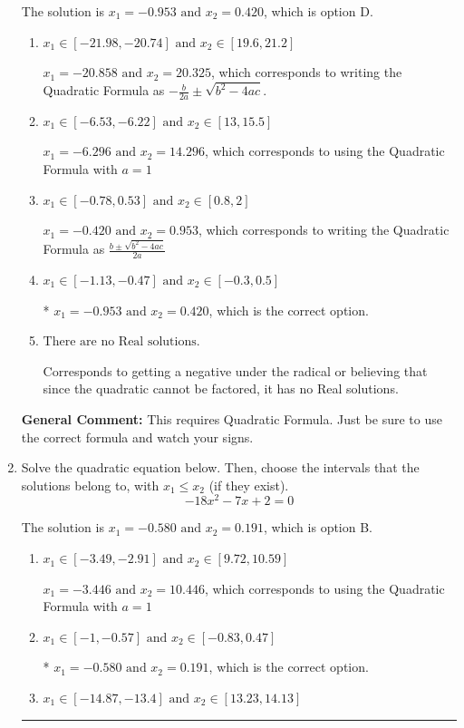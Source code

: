 \documentclass{extbook}[14pt]
\newcommand{\litem}[1]{\item #1

\rule{\textwidth}{0.4pt}}
\begin{document}
\begin{enumerate}
{The solution is \( x_1 = -0.953 \text{ and } x_2 = 0.420 \), which is option D.\begin{enumerate}[label=\Alph*.]
\item \( x_1 \in [-21.98, -20.74] \text{ and } x_2 \in [19.6, 21.2] \)

 $x_1 = -20.858 \text{ and } x_2 = 20.325$, which corresponds to writing the Quadratic Formula as $-\frac{b}{2a} \pm \sqrt{b^2 - 4ac}$.
\item \( x_1 \in [-6.53, -6.22] \text{ and } x_2 \in [13, 15.5] \)

 $x_1 = -6.296 \text{ and } x_2 = 14.296$, which corresponds to using the Quadratic Formula with $a=1$
\item \( x_1 \in [-0.78, 0.53] \text{ and } x_2 \in [0.8, 2] \)

 $x_1 = -0.420 \text{ and } x_2 = 0.953$, which corresponds to writing the Quadratic Formula as $\frac{b \pm \sqrt{b^2 - 4ac}}{2a}$
\item \( x_1 \in [-1.13, -0.47] \text{ and } x_2 \in [-0.3, 0.5] \)

* $x_1 = -0.953 \text{ and } x_2 = 0.420$, which is the correct option.
\item \( \text{There are no Real solutions.} \)

Corresponds to getting a negative under the radical or believing that since the quadratic cannot be factored, it has no Real solutions.
\end{enumerate}

\textbf{General Comment:} This requires Quadratic Formula. Just be sure to use the correct formula and watch your signs.
}
\litem{
Solve the quadratic equation below. Then, choose the intervals that the solutions belong to, with $x_1 \leq x_2$ (if they exist).
\[ -18x^{2} -7 x + 2 = 0 \]

The solution is \( x_1 = -0.580 \text{ and } x_2 = 0.191 \), which is option B.\begin{enumerate}[label=\Alph*.]
\item \( x_1 \in [-3.49, -2.91] \text{ and } x_2 \in [9.72, 10.59] \)

 $x_1 = -3.446 \text{ and } x_2 = 10.446$, which corresponds to using the Quadratic Formula with $a=1$
\item \( x_1 \in [-1, -0.57] \text{ and } x_2 \in [-0.83, 0.47] \)

* $x_1 = -0.580 \text{ and } x_2 = 0.191$, which is the correct option.
\item \( x_1 \in [-14.87, -13.4] \text{ and } x_2 \in [13.23, 14.13] \)


\end{enumerate}}
\end{enumerate}
\end{document}
